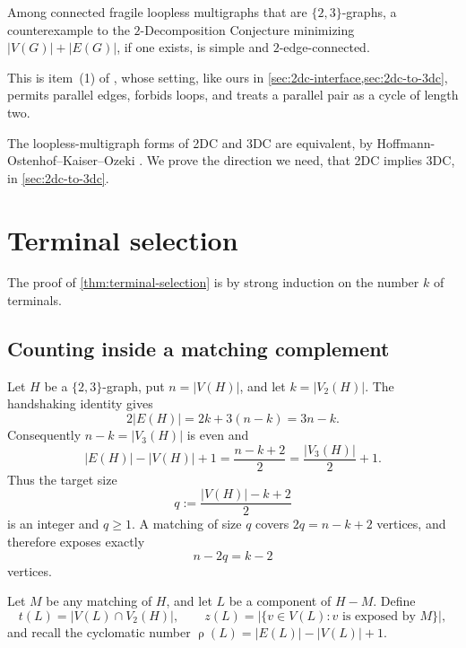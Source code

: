 \documentclass[a4paper,11pt]{article}
\newcommand{\abs}[1]{\left\lvert#1\right\rvert}
\newcommand{\Vtwo}{V_2}                      %
\newcommand{\Vthree}{V_3}                     %
\DeclareMathOperator{\cyc}{\rho}               %
\numberwithin{equation}{section}
\begin{document}
\begin{theorem}\label{thm:min-counterexample}
  Among connected fragile loopless multigraphs that are $\{2,3\}$-graphs, a
  counterexample to the $2$-Decomposition Conjecture minimizing
  $\abs{V(G)}+\abs{E(G)}$, if one exists, is simple and $2$-edge-connected.
\end{theorem}

This is item~(1) of \cite[Theorem~1.5]{BotlerJimenezSambinelliWakabayashi2024},
whose setting, like ours in \cref{sec:2dc-interface,sec:2dc-to-3dc}, permits
parallel edges, forbids loops, and treats a parallel pair as a cycle of length
two.

The loopless-multigraph forms of 2DC and 3DC are equivalent, by
Hoffmann-Ostenhof--Kaiser--Ozeki
\cite[Proposition~14]{HoffmannOstenhofKaiserOzeki2018}. We prove the direction
we need, that 2DC implies 3DC, in \cref{sec:2dc-to-3dc}.

\section{Terminal selection}\label{sec:terminal-selection}

The proof of \cref{thm:terminal-selection} is by strong induction on the number
$k$ of terminals.

\subsection{Counting inside a matching complement}\label{sec:counting}

Let $H$ be a $\{2,3\}$-graph, put $n=\abs{V(H)}$, and let $k=\abs{\Vtwo(H)}$.
The handshaking identity gives
\[
  2\abs{E(H)}=2k+3(n-k)=3n-k.
\]
Consequently $n-k=\abs{\Vthree(H)}$ is even and
\[
  \abs{E(H)}-\abs{V(H)}+1=\frac{n-k+2}{2}=\frac{\abs{\Vthree(H)}}{2}+1.
\]
Thus the target size
\[
  q:=\frac{\abs{V(H)}-k+2}{2}
\]
is an integer and $q\ge 1$. A matching of size $q$
covers $2q=n-k+2$ vertices, and therefore exposes exactly
\begin{equation}\label{eq:exposed}
  n-2q=k-2
\end{equation}
vertices.

Let $M$ be any
matching of $H$, and let $L$ be a component of $H-M$. Define
\[
  t(L)=\abs{V(L)\cap \Vtwo(H)},
  \qquad
  z(L)=\abs{\{v\in V(L):v\text{ is exposed by }M\}},
\]
and recall the cyclomatic number $\cyc(L)=\abs{E(L)}-\abs{V(L)}+1$.
\end{document}

